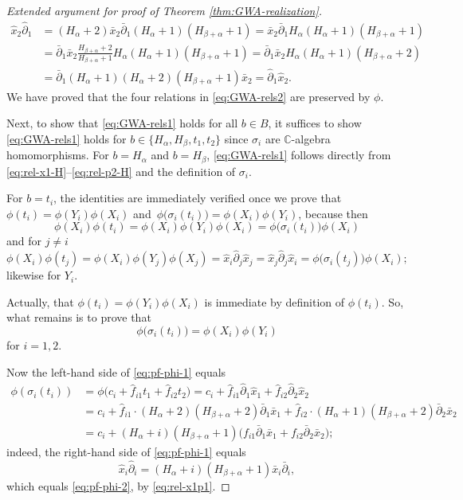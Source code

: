 \documentclass[10pt,a4paper]{amsart}
\numberwithin{equation}{section}
\begin{document}
\begin{proof}[Extended argument for proof of Theorem \ref{thm:GWA-realization}]
	\begin{align*}
		\hat{x}_2\hat{\partial}_1&=(H_\alpha+2)\bar{x}_2\bar{\partial}_1(H_\alpha+1)(H_{\beta+\alpha}+1)=\bar{x}_2\bar{\partial}_1 H_\alpha (H_\alpha+1)(H_{\beta+\alpha}+1)\\
		&=\bar{\partial}_1\bar{x}_2\frac{H_{\beta+\alpha}+2}{H_{\beta+\alpha}+1}H_\alpha (H_\alpha+1)(H_{\beta+\alpha}+1)=
		\bar{\partial}_1\bar{x}_2 H_\alpha(H_\alpha+1)(H_{\beta+\alpha}+2)\\
		&=\bar{\partial}_1(H_\alpha+1)(H_\alpha+2)(H_{\beta+\alpha}+1)\bar{x}_2=\hat{\partial}_1\hat{x}_2.
	\end{align*}
	We have proved that the four relations in \eqref{eq:GWA-rels2} are preserved by $\phi$.
	
	Next, to show that \eqref{eq:GWA-rels1} holds for all $b\in B$, it suffices to show \eqref{eq:GWA-rels1} holds for $b\in\{H_\alpha, H_\beta, t_1, t_2\}$ since $\sigma_i$ are $\mathbb{C}$-algebra homomorphisms.
	For $b=H_\alpha$ and $b=H_\beta$, \eqref{eq:GWA-rels1} follows directly from \eqref{eq:rel-x1-H}--\eqref{eq:rel-p2-H} and the definition of $\sigma_i$.
	
	For $b=t_i$, the identities are immediately verified once we prove that $\phi(t_i)=\phi(Y_i)\phi(X_i)$ and~${\phi\big(\sigma_i(t_i)\big)=\phi(X_i)\phi(Y_i)}$, because then
	\[\phi(X_i)\phi(t_i)=\phi(X_i)\phi(Y_i)\phi(X_i)=\phi\big(\sigma_i(t_i)\big)\phi(X_i)\]
	and for $j\neq i$
	\[ \phi(X_i)\phi(t_j)=\phi(X_i)\phi(Y_j)\phi(X_j)=\hat{x}_i\hat{\partial}_j\hat{x}_j=\hat{x}_j\hat{\partial}_j\hat{x}_i=\phi\big(\sigma_i(t_j)\big)\phi(X_i);\]
	likewise for $Y_i$.
	
	Actually, that $\phi(t_i)=\phi(Y_i)\phi(X_i)$ is immediate by definition of $\phi(t_i)$. So, what remains is to prove that
	\begin{equation}\label{eq:pf-phi-1}
		\phi\big(\sigma_i(t_i))=\phi(X_i)\phi(Y_i)
	\end{equation}
	for $i=1,2$.
	
	Now the left-hand side of \eqref{eq:pf-phi-1} equals
	\begin{align}
		\phi(\sigma_i(t_i))&=\phi\bigl(c_i+\hat f_{i1}t_1+\hat f_{i2}t_2\bigr)=c_i+\hat f_{i1}\hat{\partial}_1\hat{x}_1+\hat f_{i2}\hat{\partial}_2\hat{x}_2 \nonumber\\
		&=c_i+\hat f_{i1}\cdot(H_\alpha+2)(H_{\beta+\alpha}+2)\bar{\partial}_1\bar{x}_1+\hat f_{i2}\cdot (H_\alpha+1)(H_{\beta+\alpha}+2)\bar{\partial}_2\bar{x}_2\nonumber\\
		&=c_i+(H_\alpha+i)(H_{\beta+\alpha}+1)\bigl(f_{i1}\bar{\partial}_1\bar{x}_1+f_{i2}\bar{\partial}_2\bar{x}_2\bigr);\label{eq:pf-phi-2}
	\end{align}
	indeed, the right-hand side of \eqref{eq:pf-phi-1} equals
	\[\hat{x}_i\hat{\partial}_i=(H_\alpha+i)(H_{\beta+\alpha}+1)\bar{x}_i\bar{\partial}_i,\]
	which equals \eqref{eq:pf-phi-2}, by \eqref{eq:rel-x1p1}.
	

\end{proof}
\end{document}

